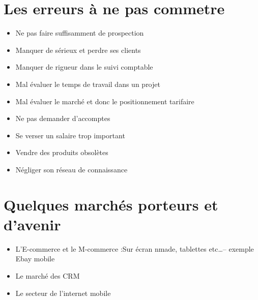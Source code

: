 \documentclass[12pt,a4paper,openany]{report}
\begin{document}
\section{Les erreurs à ne pas commetre}
\begin{itemize}
	\item Ne pas faire suffisamment de prospection
	\item Manquer de sérieux et perdre ses clients
	\item Manquer de rigueur dans le suivi comptable
	\item Mal évaluer le temps de travail dans un projet
	\item Mal évaluer le marché et donc le positionnement tarifaire
	\item Ne pas demander d'accomptes
	\item Se verser un salaire trop important
	\item Vendre des produits obsolètes
	\item Négliger son réseau de connaissance
\end{itemize}
\section{Quelques marchés porteurs et d'avenir}
\begin{itemize}
	\item L'E-commerce et le M-commerce :Sur écran nmade, tablettes etc\ldots -- exemple Ebay mobile
	\item Le marché des CRM
	\item Le secteur de l'internet mobile
\end{itemize}
\end{document}
